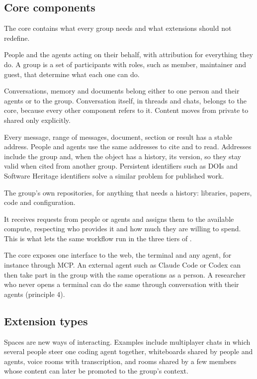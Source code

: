 \documentclass{article}
\begin{document}
\subsection{Core components}

The core contains what every group needs and what extensions should not redefine.

\begin{terms}
\item[Participants] People and the agents acting on their behalf, with attribution for everything they do. A group is a set of participants with roles, such as member, maintainer and guest, that determine what each one can do.
\item[Private and shared context] Conversations, memory and documents belong either to one person and their agents or to the group. Conversation itself, in threads and chats, belongs to the core, because every other component refers to it. Content moves from private to shared only explicitly.
\item[Addresses] Every message, range of messages, document, section or result has a stable address. People and agents use the same addresses to cite and to read. Addresses include the group and, when the object has a history, its version, so they stay valid when cited from another group. Persistent identifiers such as DOIs and Software Heritage identifiers solve a similar problem for published work.
\item[Forge] The group's own repositories, for anything that needs a history: libraries, papers, code and configuration.
\item[Work layer] It receives requests from people or agents and assigns them to the available compute, respecting who provides it and how much they are willing to spend. This is what lets the same workflow run in the three tiers of .
\end{terms}

The core exposes one interface to the web, the terminal and any agent, for instance through MCP. An external agent such as Claude Code or Codex can then take part in the group with the same operations as a person. A researcher who never opens a terminal can do the same through conversation with their agents (principle 4).

\subsection{Extension types}

Spaces are new ways of interacting. Examples include multiplayer chats in which several people steer one coding agent together, whiteboards shared by people and agents, voice rooms with transcription, and rooms shared by a few members whose content can later be promoted to the group's context.
\end{document}
